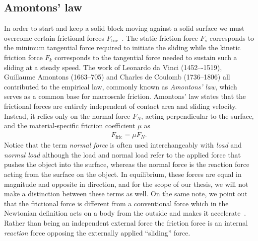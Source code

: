 


\subsection{Amontons’ law}
In order to start and keep a solid block moving against a solid surface we must
overcome certain frictional forces $F_{\text{fric}}$~\cite{gnecco_meyer_2015}.
The static friction force $F_s$ corresponds to the minimum tangential force
required to initiate the sliding while the kinetic friction force $F_k$
corresponds to the tangential force needed to sustain such a sliding at a steady
speed. The work of Leonardo da Vinci (1452–-1519), Guillaume Amontons (1663--705)
and Charles de Coulomb (1736--1806) all contributed to the empirical law,
commonly known as \textit{Amontons’ law}, which serves as a common base for macroscale
friction. Amontons’ law states that the frictional forces are entirely
independent of contact area and sliding velocity. Instead, it relies only on
the normal force $F_N$, acting perpendicular to the surface, and the material-specific friction coefficient $\mu$ as
\begin{align}
  F_{\text{fric}} = \mu F_N.
  \label{eq:amonton}
\end{align}
Notice that the term \textit{normal force} is often used interchangeably with \textit{load} and \textit{normal load} although the load and normal load refer to the applied force that pushes the object into the surface, whereas the normal force is the reaction force acting from the surface on the object. In equilibrium, these forces are equal in magnitude and opposite in direction, and for the scope of our thesis, we will not make a distinction between these terms as well. On the same note, we point out that the frictional force is different from a conventional force which in the Newtonian definition acts on a body from the outside and makes it accelerate~\cite{gao_frictional_2004}. Rather than being an independent external force the friction force is an internal \textit{reaction} force opposing the externally applied ``sliding'' force. 

